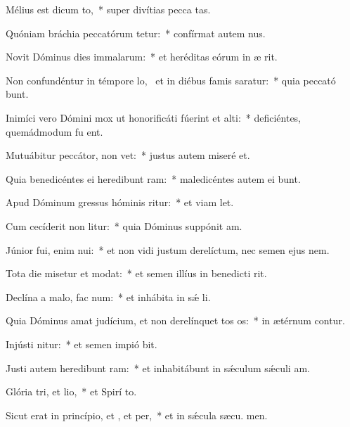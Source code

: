 \item Mélius est dicum to,~* super divítias pecca tas.
\item Quóniam bráchia peccatórum tetur:~* confírmat autem  nus.
\item Novit Dóminus dies immalarum:~* et heréditas eórum in æ rit.
\item Non confundéntur in témpore lo,~\pscross{} et in diébus famis saratur:~* quia peccató bunt.
\item Inimíci vero Dómini mox ut honorificáti fúerint et alti:~* deficiéntes, quemádmodum fu ent.
\item Mutuábitur peccátor,  non vet:~* justus autem miseré  et.
\item Quia benedicéntes ei heredibunt ram:~* maledicéntes autem ei bunt.
\item Apud Dóminum gressus hóminis ritur:~* et viam  let.
\item Cum cecíderit non litur:~* quia Dóminus suppónit  am.
\item Júnior fui, enim nui:~* et non vidi justum derelíctum, nec semen ejus  nem.
\item Tota die misetur et modat:~* et semen illíus in benedicti rit.
\item Declína a malo,  fac num:~* et inhábita in sǽ li.
\item Quia Dóminus amat judícium, et non derelínquet tos os:~* in ætérnum contur.
\item Injústi nitur:~* et semen impió bit.
\item Justi autem heredibunt ram:~* et inhabitábunt in sǽculum sǽculi  am.
\item Glória tri, et lio,~* et Spirí to.
\item Sicut erat in princípio, et , et per,~* et in sǽcula sæcu. men.
